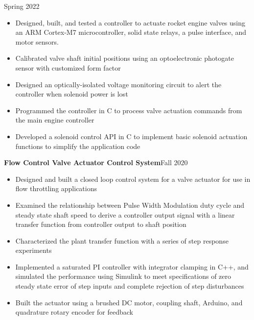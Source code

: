 \documentclass{article}
\begin{document}
\hfill
\vspace{0.5em}
Spring 2022
\begin{itemize}
\item{Designed, built, and tested a controller to actuate rocket engine valves using an ARM Cortex-M7 microcontroller, solid state relays, a pulse interface, and motor sensors.}
\item{Calibrated valve shaft initial positions using an optoelectronic photogate sensor with customized form factor}
\item{Designed an optically-isolated voltage monitoring circuit to alert the controller when solenoid power is lost}
\item{Programmed the controller in C to process valve actuation commands from the main engine controller}
\item{Developed a solenoid control API in C to implement basic solenoid actuation functions to simplify the application code}
\end{itemize}
\vspace{1em}
\textbf{Flow Control Valve Actuator Control System}\hfill Fall 2020
\vspace{0.5em}
\begin{itemize}
	\item Designed and built a closed loop control system for a valve actuator for use in flow throttling applications
	\item Examined the relationship between Pulse Width Modulation duty cycle and steady state shaft speed to derive a controller output signal with a linear transfer function from controller output to shaft position  
	\item Characterized the plant transfer function with a series of step response experiments
	\item  Implemented a saturated PI controller with integrator clamping in C++, and simulated the performance using Simulink to meet specifications of zero steady state error of step inputs and complete rejection of step disturbances
	\item  Built the actuator using a brushed DC motor, coupling shaft, Arduino, and quadrature rotary encoder for feedback
\end{itemize}
\vspace{0.5em}
\thispagestyle{empty}
\thispagestyle{empty}
\end{document}
